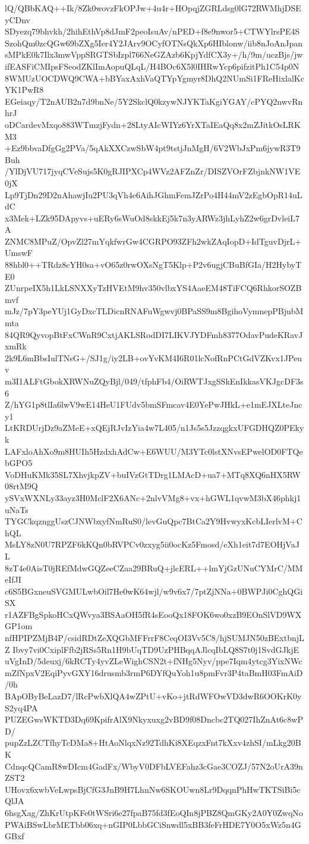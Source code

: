 lQ/QBbKAQ++Ik/8Zk0wovzFkOPJw+4u4r+HOpqjZGRLdsg0lG72RWMhjDSEyCDnv
SDyezq79bhvkh/2hihEthVp8dJmF2peoIsuAv/nPED+f8e9nwor5+CTWYlrsPE4S
SzohQm0zcQGw69bZXg5Ier4Y2JArv9OCyfOTNsQkXp6HIblonw/iib8nJoAnJpan
sMPkE0k7Ilx3mwVppSRGTSbIzpl766NeGZAzb6KpjYdfCX3y+/h/9m/uczBjs/jw
ifEASFiCMIpsFSeodZKlImAopuQLqL/H4BOc6X5l0IHRwYcp6pifzitPh1C54p0N
8WMUzUOCDWQ9CWA+bBYaxAxhVaQTYpYgmyr8DhQ2NUmSi1FReHixlalKcYK1PwR8
EGeiaqy/T2nAUB2n7d9bnNe/5Y2SkclQ0kzywNJYKTaKgiYGAY/cPYQ2nwvRnhrJ
oDCardevMxqo883WTmzjFydn+28LtyAIcWIYz6YrXTaIEaQq8x2mZJitkOsLRKM3
+Ez9bbvaDfgGg2PVa/5qAkXXCzwSbW4pt9tstjJnMgH/6V2WbJxPm6jywR3T9Buh
/YlDjVU717jyqCVeSujs5K0gRJIPXCp4WVz2AFZnZr/DISZVOrFZbjnkNW1VE0jX
Lp9TjDn29D2nAhawjIu2PU3qVh4e6AihJGhmFemJZrPo4H44mV2zEgbOpR14uLdC
x3Mek+LZk95DApyvs+uERy6sWuOd8skkEj5k7n3yARWz3jhLyhZ2w6grDvleiL7A
ZNMC8MPuZ/OpvZl27mYqkfwrGw4CGRPO93ZFh2wkZAqIopD+IdTguvDjrL+UmswF
88hbl0++TRdz8cYH0sa+vO65z0rwOXsNgT5Klp+P2v6ugjCBuBfGIa/H2HybyTE0
ZUnrpeIX5h1LkLSNXXyTzHVEtM9hv350vlbxYS4AaeEM48TiFCQ6RhkorSOZBmvf
mJz/7pY3peYUj1GyDxcTLDicnRNAFuWgwvj0BPaSS9m8BgihoVymnepPBjubMmta
84QR9QyvopBtFxCWnR9CxtjAKLSRodDI7LIKVJYDFmh8377OdavPudeKRavJxmRk
2k9L6mBbsIulTNsG+/SJ1g/iy2LB+ovYvKM4I6R01lcNofRnPCtGdVZKvx1JPeuv
m3I1ALFtGbokXRWNuZQyBjl/049/tfphFb4/OiRWTJxgSSkEnIkkasVKJgcDF3s6
Z/hYG1p8tlIa6lwV9wE14HeU1FUdv5bmSFmcav4E0YePwJHkL+e1mEJXLteJncy1
LtKRDUrjDz9aZMeE+xQEjRJvIzYia4w7L405/n1Js5s5JzzqgkxUFGDHQZ0PEkyk
LAFxloAhXo9m8HUIh5HzdxhAdCw+E6WUU/M3YTc0lstXNvsEPwelOD0FTQebGPO5
VoDHuKMk35SL7XhvjkpZV+buIVzGtTDrg1LMAcD+ua7+MTq8XQ6nHX5RW08rtM9Q
ySVxWXNLy33ayz3H0MclF2X6ANc+2nlvVMg8+vx+hGWL1qvwM3bX46phkj1uNaTs
TYGCkqznggUszCJNWbxyfNmRuS0/levGuQpc7BtCa2Y9HvwyxKcbLIerlvM+ChQL
MsLY8zN0U7RPZF6kKQn0bRVPCv0zxyg5ii0ocKz5Fmosd/eXh1eit7d7EOHjVaJL
8zT4e0AisT0jREfMdwGQZeeCZaa29BRuQ+jlcERL++lmYjGzUNuCYMrC/MMeIfJI
c6S5BGxneuSVGMULwbOil7He0wK64wjl/w9v6x7/7ptZjNNa+0BWPJi0CghQGiSX
r1AZFBgSpkoHCxQWvya3BSAaOH5fR4sEooQx18FOK6wo0xzB9EOnSlVD9WXGP1om
nfHPIPZMjB4P/csidRDtZeXQGbMFFrrF8CeqOI3Vv5C8/hjSUMJN50zBExtbnjLZ
Ibvy7vi0CxiplFfb2jRSs5Rn1H9bUqTD9UzPHBqqAJlcqIbLQ8S7t0j1SvdGJkjE
uVgInD/5deuxj/6kRCTy4yvZLeWighCSN2t+fNHg5Nyv/ppe7Iqm4ytcg3YixNWc
mZfNpxV2EqiPyvGXY16drusmb3rmP6DYfQuYoh1u8pmFvr3P4taBmH03FmAiD/0h
BApOByBeLazD7/lRcPwbXlQA4wZPtU+vKo+jtRdWFOwVD3dwR6OOKrK0yS2yq4PA
PUZEGwsWKTD3Dq69KpifrAlX9Nkyxuxg2vBD9f08Dncbc2TQ027IhZnAt6c8wPD/
pupZzLZCTfhyTcDMa8+HtAoNlqxNz92TdhKi8XEqzxFnt7kXxv4zhSI/mLkg20BK
CdnqcQCamR8wDIcm4GadFx/WbyV0DFbLVEFahz3cGae3COZJ/57N2oUrA39nZST2
UHovx6xwbVeLwpsBjCfG3JnB9H7LhnNw6SKOUwn8Lr9DqqnPhHwTKTSiBi5cQlJA
6hsgXag/ZhKrUtpKFe0tWSri6e27fpaB75fd3fEoQIn8jPBZ8QmGKy2A0Y0ZwqNo
PWAiBSwLbrMETbb06xq+nGIP0LbbGCiSnwdl5xBB3feFrHDE7Y0O5xWz5n4GGBxf
